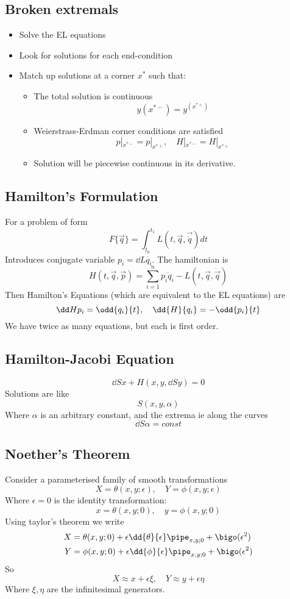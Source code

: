 \documentclass{E:/Documents/Latex/myassignment}
\begin{document}
\subsection{Broken extremals}
\begin{itemize}
	\item Solve the EL equations
	\item Look for solutions for each end-condition
	\item Match up solutions at a corner $x^*$ such that:
	\begin{itemize}
		\item The total solution is continuous
		\[y(x^{*-}) = y^(x^{*+})\]
		\item Weierstrass-Erdman corner conditions are satisfied
		\[p|_{x^{*-}} = p|_{x^{*+}}, \quad H|_{x^{*-}} = H|_{x^{*+}}  \]
		\item Solution will be piecewise continuous in its derivative.
	\end{itemize}
\end{itemize}


\subsection{Hamilton's Formulation}
For a problem of form
\[F\{\vec q\} = \int_{t_0}^{t_1} L(t,\vec q, \vec{\dot q}) dt \]
Introduces conjugate variable $p_i = \dd L{\dot {q_i}}$.
The hamiltonian is
\[H(t,\vec q,\vec p) = \sum_{i=1}^n p_i \dot q_i - L(t,\vec q,\dot{\vec q})\]
Then Hamilton's Equations (which are equivalent to the EL equations) are
\[\dd H{p_i} = \odd{q_i}{t}, \quad \dd{H}{q_i} = - \odd{p_i}{t}\]
We have twice as many equations, but each is first order.

\subsection{Hamilton-Jacobi Equation}
\[\dd Sx + H\left(x,y, \dd Sy\right) = 0\]
Solutions are like
\[S(x,y,\alpha)\]
Where $\alpha$ is an arbitrary constant, and the extrema ie along the curves
\[\dd S \alpha = const\]


\subsection{Noether's Theorem}
Consider a parameterised family of smooth transformations
\[X = \theta(x,y; \epsilon), \quad Y = \phi(x,y; \epsilon)\]
Where $\epsilon=0$ is the identity transformation:
\[x = \theta(x,y;0), \quad y = \phi(x,y;0)\]
Using taylor's theorem we write
\begin{align*}
	X &= \theta(x,y;0) + \epsilon \dd{\theta}{\epsilon}\pipe_{x,y;0} + \bigo(\epsilon^2)\\
	Y &= \phi(x,y;0) + \epsilon \dd{\phi}{\epsilon}\pipe_{x,y;0} + \bigo(\epsilon^2)\\
\end{align*}
So
\[X\approx x + \epsilon \xi, \quad Y \approx y + \epsilon \eta\]
Where $\xi, \eta$ are the infinitesimal generators.
\end{document}
